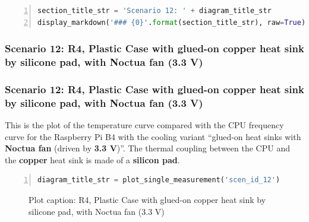 \documentclass[10pt,parskip=half,
toc=sectionentrywithdots,
bibliography=totocnumbered,
captions=tableheading,numbers=noendperiod]{scrartcl}
\begin{document}
\begin{lstlisting}[language=Python,numbers=left,xleftmargin=20pt,xrightmargin=5pt,belowskip=5pt,aboveskip=5pt]
section_title_str = 'Scenario 12: ' + diagram_title_str
display_markdown('### {0}'.format(section_title_str), raw=True)
\end{lstlisting}

\hypertarget{scenario-12-r4-plastic-case-with-glued-on-copper-heat-sink-by-silicone-pad-with-noctua-fan-3.3-v}{%
\subsubsection{Scenario 12: R4, Plastic Case with glued-on copper heat
sink by silicone pad, with Noctua fan (3.3
V)}\label{scenario-12-r4-plastic-case-with-glued-on-copper-heat-sink-by-silicone-pad-with-noctua-fan-3.3-v}}

\hypertarget{scenario-12-r4-plastic-case-with-glued-on-copper-heat-sink-by-silicone-pad-with-noctua-fan-3.3-v}{%
\subsubsection{Scenario 12: R4, Plastic Case with glued-on copper heat
sink by silicone pad, with Noctua fan (3.3
V)}\label{scenario-12-r4-plastic-case-with-glued-on-copper-heat-sink-by-silicone-pad-with-noctua-fan-3.3-v}}

This is the plot of the temperature curve compared with the CPU
frequency curve for the Raspberry Pi B4 with the cooling variant
``glued-on heat sinks with \textbf{Noctua fan} (driven by \textbf{3.3
V})''. The thermal coupling between the CPU and the \textbf{copper} heat
sink is made of a \textbf{silicon pad}.

\begin{codecell}
\label{code:scenario_12}
\begin{lstlisting}[language=Python,numbers=left,xleftmargin=20pt,xrightmargin=5pt,belowskip=5pt,aboveskip=5pt]
diagram_title_str = plot_single_measurement('scen_id_12')
\end{lstlisting}\end{codecell}

\begin{figure}[H]\begin{center}\end{center}\caption{Plot caption: R4, Plastic Case with glued-on copper heat sink by
silicone pad, with Noctua fan (3.3 V)}\label{fig:scenario_12}\end{figure}
\end{document}

